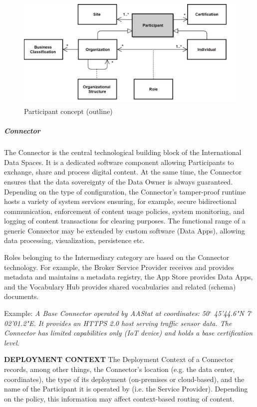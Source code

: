 \begin{figure}[H]
	\begin{Center}
		\includegraphics[width=4.68in,height=2.15in]{./media/image49.png}
		\caption{Participant concept (outline)}
		\label{fig:Participant_concept_outline}
	\end{Center}
\end{figure}



\subparagraph*{Connector}
The Connector is the central technological building block of the International Data Spaces. It is a dedicated software component allowing Participants to exchange, share and process digital content. At the same time, the Connector ensures that the data sovereignty of the Data Owner is always guaranteed. Depending on the type of configuration, the Connector’s tamper-proof runtime hosts a variety of system services ensuring, for example, secure bidirectional communication, enforcement of content usage policies, system monitoring, and logging of content transactions for clearing purposes. The functional range of a generic Connector may be extended by custom software (Data Apps), allowing data processing, visualization, persistence etc. 

Roles belonging to the Intermediary category are based on the Connector technology. For example, the Broker Service Provider receives and provides metadata and maintains a metadata registry, the App Store provides Data Apps, and the Vocabulary Hub provides shared vocabularies and related (schema) documents. 

Example: \textit{A Base Connector operated by AAStat at coordinates: 50$ ^{\circ} $ 45'44.6"N 7$ ^{\circ} $ 02'01.2"E. It provides an HTTPS 2.0 host serving traffic sensor data. The Connector has limited capabilities only (IoT device) and holds a base certification level}. 

\textbf{DEPLOYMENT CONTEXT }The Deployment Context of a Connector records, among other things, the Connector’s location (e.g. the data center, coordinates), the type of its deployment (on-premises or cloud-based), and the name of the Participant it is operated by (i.e. the Service Provider). Depending on the policy, this information may affect context-based routing of content. 

